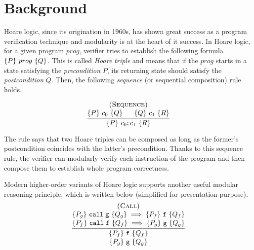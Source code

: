 \section{Background}
\label{sec:program:background}

Hoare logic, since its origination in 1960s, has shown great success as a program verification technique and modularity is at the heart of it success.
In Hoare logic, for a given program $prog$, verifier tries to establish the following formula $\{{P}\}~{prog}~\{{Q}\}$.
This is called {\it Hoare triple} and means that if the $prog$ starts in a state satisfying the {\it precondition} $P$,
its returning state should satisfy the {\it postcondition} $Q$.
Then, the following {\it sequence} (or sequential composition) rule holds.

\[
\infer
    {\hoare{P}{c_{0} ; c_{1}}{R}}
    {\deduce{\hoare{P}{c_{0}}{Q} \;\;\;\;\;\; \hoare{Q}{c_{1}}{R}}
      {\textsc{(Sequence)}}}
\]

\noindent The rule says that two Hoare triples can be composed as long as the former's postcondition coincides with the latter's precondition. Thanks to this sequence rule, the verifier can modularly verify each instruction of the program and then compose them to establish whole program correctness.



Modern higher-order variants of Hoare logic\cite{VST,appel:plcc} supports another useful modular reasoning principle, which is written below (simplified for presentation purpose).%
\[
\infer
    {\deduce{\hoare{P_{g}}{\code{g}}{Q_{g}}}{\hoare{P_{f}}{\code{f}}{Q_{f}}}}
    {\deduce{\hoare{P_{f}}{\code{call} \; \code{f}}{Q_{f}} \implies \hoare{P_{g}}{\code{g}}{Q_{g}}}
            {\deduce{\hoare{P_{g}}{\code{call} \; \code{g}}{Q_{g}} \implies \hoare{P_{f}}{\code{f}}{Q_{f}}}
                    {\textsc{(Call)}}}
    }
\]

